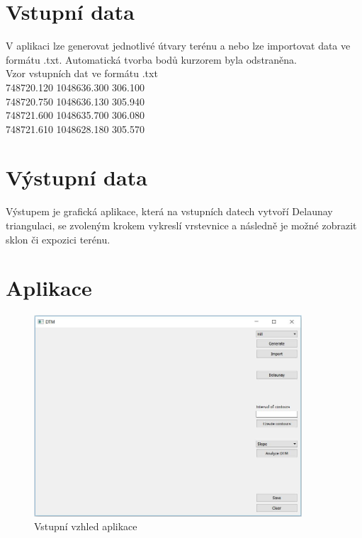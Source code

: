 \documentclass[a4paper, 12pt]{article}
\begin{document}
\section{Vstupní data}
V aplikaci lze generovat jednotlivé útvary terénu a nebo lze importovat data ve formátu .txt. Automatická tvorba bodů kurzorem byla odstraněna.\\

Vzor vstupních dat ve formátu .txt\\
 748720.120    1048636.300     306.100\\
 748720.750    1048636.130     305.940\\
 748721.600    1048635.700     306.080\\
 748721.610    1048628.180     305.570\\

\section{Výstupní data}
Výstupem je grafická aplikace, která na vstupních datech vytvoří Delaunay triangulaci, se zvoleným krokem vykreslí vrstevnice a následně je možné zobrazit sklon či expozici terénu. 

\clearpage
\section{Aplikace}

\begin{figure}[h!]
\centering
\includegraphics[width=10cm]{pictures/vstup.jpg}
\caption{Vstupní vzhled aplikace}
\end{figure}
\end{document}
